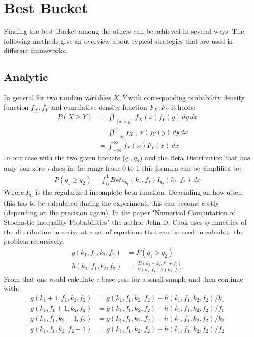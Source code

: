 \documentclass[../Thesis.tex]{subfiles}
\begin{document}
\section{Best Bucket}
Finding the best Bucket among the others can be achieved in several ways. The following methods give an overview about typical strategies that are used in different frameworks.

\subsection{Analytic}
In general for two random variables $X,Y$ with corresponding probability density function $f_X,f_Y$ and cumulative density function $F_X,F_Y$ it holds: 
\begin{align*}
P(X \geq Y ) &= \iint_{[x>y]} f_X(x)f_Y(y) \,dy\,dx \\
			 &= \iint_{-\infty}^{x} f_X(x)f_Y(y) \,dy\,dx \\
			 &= \int_{-\infty}^{\infty}f_X(x)F_Y(x)\,dx
\end{align*}
In our case with the two given buckets ($q_1,q_2$) and the Beta Distribution that has only non-zero values in the range from 0 to 1 this formula can be simplified to:
\begin{align*}
P(q_1 \geq q_2 ) = \int_{0}^{1}Beta_{q_1}(k_1,f_1)I_{q_2}(k_2,f_2)\,dx
\end{align*}
Where $I_{q_2}$ is the regularized incomplete beta function. Depending on how often this has to be calculated during the experiment, this can become costly (depending on the precision again). In the paper "Numerical Computation of Stochastic Inequality Probabilities" the author John D. Cook \cite{cook2008numerical} uses symmetries of the distribution to arrive at a set of equations that can be used to calculate the problem recursively.
\begin{align*}
g(k_1,f_1,k_2,f_2) &= P(q_1>q_2) \\
h(k_1,f_1,k_2,f_2) &= \frac{B(k_1+k_2,f_1+f_2)}{B(k_1,f_1)B(k_2,f_2)}
\end{align*}
From that one could calculate a base case for a small sample and then continue with:
\begin{align*}
g(k_1 + 1,f_1,k_2,f_2) &= g(k_1,f_1,k_2,f_2) + h(k_1,f_1,k_2,f_2)/k_1 \\
g(k_1,f_1 + 1,k_2,f_2) &= g(k_1,f_1,k_2,f_2) - h(k_1,f_1,k_2,f_2)/f_1 \\
g(k_1,f_1,k_2 + 1,f_2) &= g(k_1,f_1,k_2,f_2) - h(k_1,f_1,k_2,f_2)/k_2 \\
g(k_1,f_1,k_2,f_2 + 1) &= g(k_1,f_1,k_2,f_2) + h(k_1,f_1,k_2,f_2)/f_2 \\
\end{align*}
\end{document}
